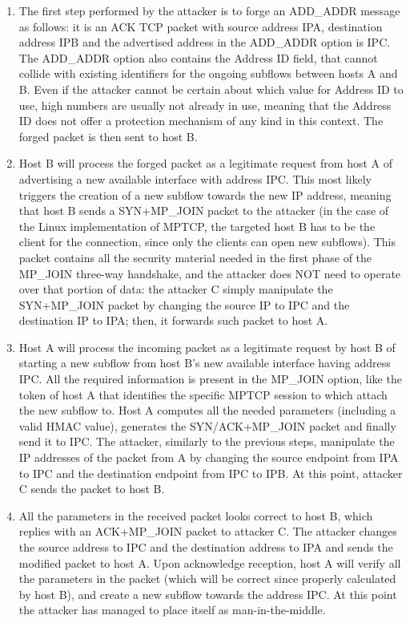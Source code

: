 \begin{enumerate}  
\item  The first step performed by the attacker is to forge an ADD\_ADDR message as follows: it is an ACK TCP packet with source address IPA, destination address IPB and the advertised address in the ADD\_ADDR option is IPC. The ADD\_ADDR option also contains the Address ID field, that cannot collide with existing identifiers for the ongoing subflows between hosts A and B. Even if the attacker cannot be certain about which value for Address ID to use, high numbers are usually not already in use, meaning that the Address ID does not offer a protection mechanism of any kind in this context.
The forged packet is then sent to host B.

\item Host B will process the forged packet as a legitimate request from host A of advertising a new available interface with address IPC. This most likely triggers the creation of a new subflow towards the new IP address, meaning that host B sends a SYN+MP\_JOIN packet to the attacker (in the case of the Linux implementation of MPTCP, the targeted host B has to be the client for the connection, since only the clients can open new subflows). This packet contains all the security material needed in the first phase of the MP\_JOIN three-way handshake, and the attacker does NOT need to operate over that portion of data: the attacker C simply manipulate the SYN+MP\_JOIN packet by changing the source IP to IPC and the destination IP to IPA; then, it forwards such packet to host A.

\item Host A will process the incoming packet as a legitimate request by host B of starting a new subflow from host B's new available interface having address IPC. All the required information is present in the MP\_JOIN option, like the token of host A that identifies the specific MPTCP session to which attach the new subflow to. Host A computes all the needed parameters (including a valid HMAC value), generates the SYN/ACK+MP\_JOIN packet and finally send it to IPC. The attacker, similarly to the previous steps, manipulate the IP addresses of the packet from A by changing the source endpoint from IPA to IPC and the destination endpoint from IPC to IPB. At this point, attacker C sends the packet to host B.

\item All the parameters in the received packet looks correct to host B, which replies with an ACK+MP\_JOIN packet to attacker C. The attacker changes the source address to IPC and the destination address to IPA and sends the modified packet to host A. Upon acknowledge reception, host A will verify all the parameters in the packet (which will be correct since properly calculated by host B), and create a new subflow towards the address IPC. At this point the attacker has managed to place itself as man-in-the-middle.


\end{enumerate}
